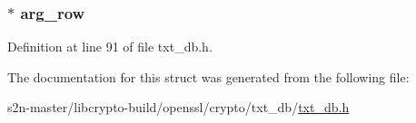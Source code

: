 \subsubsection[{\texorpdfstring{arg\+\_\+row}{arg_row}}]{ $\ast$ arg\+\_\+row}\hypertarget{structtxt__db__st_aa903822f206b9936e503daa6f636749d}{}\label{structtxt__db__st_aa903822f206b9936e503daa6f636749d}


Definition at line 91 of file txt\+\_\+db.\+h.



The documentation for this struct was generated from the following file\+:\begin{DoxyCompactItemize}
\item 
s2n-\/master/libcrypto-\/build/openssl/crypto/txt\+\_\+db/\hyperlink{crypto_2txt__db_2txt__db_8h}{txt\+\_\+db.\+h}\end{DoxyCompactItemize}
